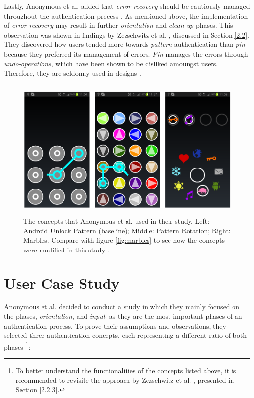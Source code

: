 Lastly, Anonymous et al. \cite{anonymous} added that \textit{error recovery} should be cautiously managed throughout the authentication process \cite{anonymous}. As mentioned above, the implementation of \textit{error recovery} may result in further \textit{orientation} and \textit{clean up} phases. This observation was shown in findings by Zezschwitz et al. \cite{PatternWild}, discussed in Section \ref{2.2}. They discovered how users tended more towards \textit{pattern} authentication than \textit{pin} because they preferred its management of errors. \textit{Pin} manages the errors through \textit{undo-operations}, which have been shown to be disliked amoungst users. Therefore, they are seldomly used in designs \cite{PatternWild, anonymous}. 

\begin{figure}[t!]
\centering
\includegraphics[width=14cm, height=7cm]{Chapters/graphics/androidPatternMarble.PNG}
\caption{The concepts that Anonymous et al. \cite{anonymous} used in their study. Left: Android Unlock Pattern (baseline); Middle: Pattern Rotation; Right: Marbles. Compare with figure \ref{fig:marbles} to see how the concepts were modified in this study \cite{anonymous}.}
\label{fig:android}
\end{figure}

\section{User Case Study}

Anonymous et al. \cite{anonymous} decided to conduct a study in which they mainly focused on the phases, \textit{orientation}, and \textit{input}, as they are the most important phases of an authentication process. To prove their assumptions and observations, they selected three authentication concepts, each representing a different ratio of both phases \cite{anonymous}
\footnote{To better understand the functionalities of the concepts listed above, it is recommended to revisite the approach by Zezschwitz et al. \cite{Marbles}, presented in Section \ref{2.2.3}.}: 

